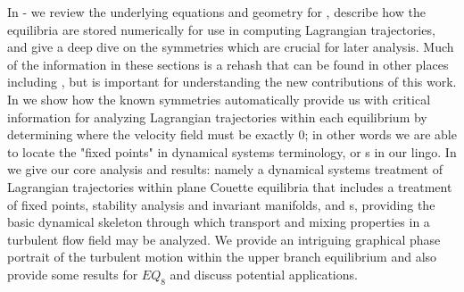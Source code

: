 In - we review the underlying equations 
and geometry for {\pCf}, describe how the equilibria are stored 
numerically for use in computing Lagrangian trajectories, and give a deep 
dive on the symmetries which are crucial for later analysis. Much of the 
information in these sections is a rehash that can be found in other 
places including \citet{GHCW07}, but is important for understanding the 
new contributions of this work.  In  we show how 
the known symmetries automatically provide us with critical information 
for analyzing Lagrangian trajectories within each equilibrium by 
determining where the velocity field must be exactly 0; in other words we 
are able to locate the "fixed points" in dynamical systems terminology, 
or {\stagp}s in our lingo. In  we give our core 
analysis and results: namely a dynamical systems treatment of Lagrangian 
trajectories within plane Couette equilibria that includes a treatment of 
fixed points, stability analysis and invariant manifolds, and {\hc}s, 
providing the basic dynamical skeleton through which transport and mixing 
properties in a turbulent flow field may be analyzed. We provide an 
intriguing graphical phase portrait of the turbulent motion within the 
upper branch equilibrium and also provide some results for $EQ_8$ and 
discuss potential applications. 

